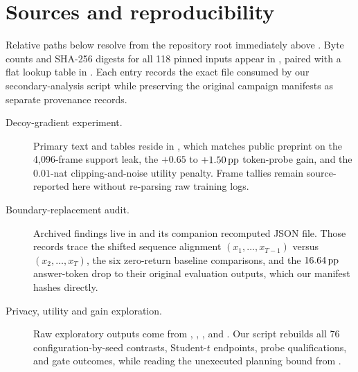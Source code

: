 \section{Sources and reproducibility}
\label{app:artifacts}

Relative paths below resolve from the repository root immediately above
. Byte counts and SHA-256 digests for all 118 pinned
inputs appear in , paired with a
flat lookup table in . Each entry
records the exact file consumed by our secondary-analysis script while
preserving the original campaign manifests as separate provenance records.

\begin{description}
\item[\hypertarget{artifact-E1}{Decoy-gradient experiment.}]
Primary text and tables reside in
, which matches public
preprint \cite{paper1} on the 4,096-frame support leak, the $+0.65$ to
$+1.50\,\mathrm{pp}$ token-probe gain, and the $0.01$-nat clipping-and-noise utility
penalty. Frame tallies remain source-reported here without re-parsing raw
training logs.

\item[\hypertarget{artifact-B1}{Boundary-replacement audit.}]
Archived findings live in
and its companion recomputed JSON file. Those records trace the shifted
sequence alignment $(x_1,\ldots,x_{T-1})$ versus $(x_2,\ldots,x_T)$, the
six zero-return baseline comparisons, and the $16.64\,\mathrm{pp}$ answer-token drop
to their original evaluation outputs, which our manifest hashes directly.

\item[\hypertarget{artifact-R1}{Privacy, utility and gain exploration.}]
Raw exploratory outputs come from
,
,
, and
. Our script rebuilds
all 76 configuration-by-seed contrasts, Student-$t$ endpoints, probe
qualifications, and gate outcomes, while reading the unexecuted planning
bound from
.


\end{description}

